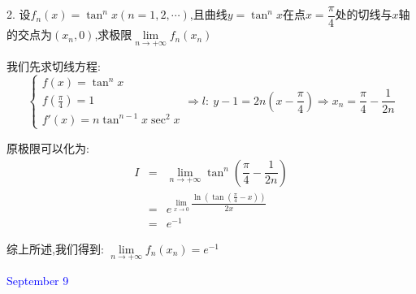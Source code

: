 2. 设$f_{n}(x)=\tan^n x(n=1,2,\cdots)$,且曲线$y=\tan^n x$在点$x=\dfrac{\pi}{4}$处的切线与$x$轴的交点为$(x_{n},0)$,求极限$\lim\limits_{n\to+\infty}f_{n}(x_{n})$
\begin{solution}

	我们先求切线方程:  
	$$\left\lbrace
	\begin{array}{l}
		f(x)=\tan^n x\\
		f(\frac{\pi}{4})=1\\
		f'(x)=n\tan^{n-1}x\sec^2 x
	\end{array}
	\right. \Rightarrow l:\ y-1=2n(x-\dfrac{\pi}{4})\Rightarrow x_{n}=\dfrac{\pi}{4}-\dfrac{1}{2n}$$
	
	原极限可以化为:  
	\begin{eqnarray*}
		I&=&\lim\limits_{n\to+\infty}\tan^{n}\left( \dfrac{\pi}{4}-\dfrac{1}{2n}\right) \\
		&=&e^{\lim\limits_{x\to 0}\dfrac{\ln(\tan(\frac{\pi}{4}-x))}{2x}}\\
		&=&e^{-1}
	\end{eqnarray*}

	综上所述,我们得到:  $\lim\limits_{n\to+\infty}f_{n}(x_{n})=e^{-1}$
\end{solution}

\textcolor{blue}{September 9}

